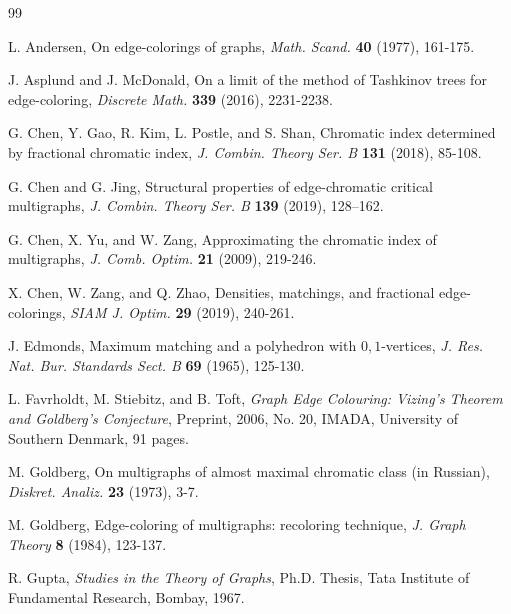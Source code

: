 \documentclass[11pt]{article}
\begin{document}
\begin{thebibliography}{99}

 L. Andersen, On edge-colorings of graphs, {\em Math. Scand.} {\bf 40}
(1977), 161-175.

\vspace{-2mm}
 J. Asplund and J. McDonald, On a limit of the method of Tashkinov trees for edge-coloring,
{\em Discrete Math.} {\bf 339} (2016), 2231-2238.

\vspace{-2mm}
 G. Chen, Y. Gao, R. Kim, L. Postle, and S. Shan, Chromatic index determined by fractional chromatic
index, {\em J. Combin. Theory Ser. B} {\bf 131} (2018), 85-108.

\vspace{-2mm}
 G. Chen and G. Jing, Structural properties of edge-chromatic critical multigraphs,  
{\em J. Combin. Theory Ser. B} {\bf 139} (2019), 128–162.

\vspace{-2mm}
 G. Chen, X. Yu, and W. Zang, Approximating the chromatic index of multigraphs, {\em J.
Comb. Optim.} {\bf 21} (2009), 219-246.

\vspace{-2mm}
 X. Chen, W. Zang, and Q. Zhao, Densities, matchings, and fractional edge-colorings,
{\em SIAM J. Optim.} {\bf 29} (2019), 240-261. 

\vspace{-2mm}
 J. Edmonds, Maximum matching and a polyhedron with $0,1$-vertices, {\em J. Res.
Nat. Bur. Standards Sect. B} {\bf 69} (1965), 125-130.

\vspace{-2mm}
 L. Favrholdt, M. Stiebitz, and B. Toft, {\em Graph Edge Colouring: Vizing's Theorem and 
Goldberg's Conjecture}, Preprint, 2006, No. 20, IMADA, University of Southern Denmark, 91 pages. 

\vspace{-2mm}
 M. Goldberg, On multigraphs of almost maximal chromatic class (in Russian),
{\em Diskret. Analiz.} {\bf 23} (1973), 3-7.

\vspace{-2mm}
 M. Goldberg, Edge-coloring of multigraphs: recoloring technique,
{\em J. Graph Theory} {\bf 8} (1984), 123-137.

\vspace{-2mm}
 R. Gupta, {\it Studies in the Theory of Graphs},  Ph.D. Thesis, Tata Institute of 
Fundamental Research, Bombay, 1967.


\end{thebibliography}
\end{document}
